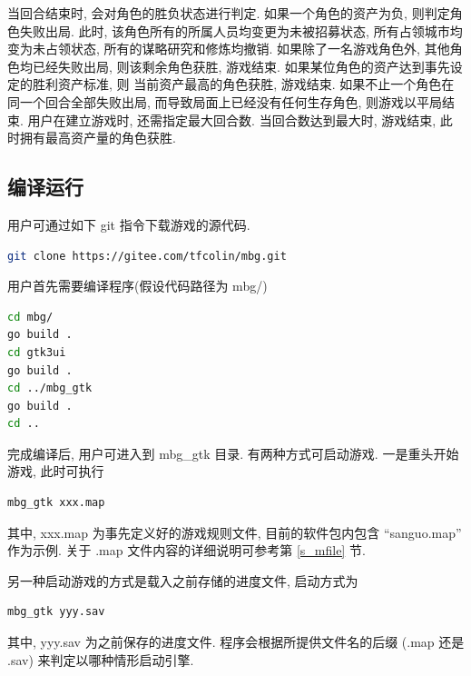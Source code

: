 \documentclass[UTF8, zihao=-4]{ctexart} %
\begin{document}
当回合结束时, 会对角色的胜负状态进行判定. 如果一个角色的资产为负, 则判定角色失败出局. 
此时, 该角色所有的所属人员均变更为未被招募状态, 所有占领城市均变为未占领状态,
所有的谋略研究和修炼均撤销. 如果除了一名游戏角色外, 其他角色均已经失败出局, 
则该剩余角色获胜, 游戏结束. 如果某位角色的资产达到事先设定的胜利资产标准, 则
当前资产最高的角色获胜, 游戏结束. 
如果不止一个角色在同一个回合全部失败出局, 而导致局面上已经没有任何生存角色, 则游戏以平局结束.
用户在建立游戏时, 还需指定最大回合数. 当回合数达到最大时, 游戏结束, 此时拥有最高资产量的角色获胜.

\subsection{编译运行}
\label{s_compile}
用户可通过如下 git 指令下载游戏的源代码.
\begin{lstlisting}[language=bash]
git clone https://gitee.com/tfcolin/mbg.git
\end{lstlisting}

用户首先需要编译程序(假设代码路径为 mbg/)
\begin{lstlisting}[language=bash]
cd mbg/
go build .
cd gtk3ui
go build .
cd ../mbg_gtk
go build .
cd ..
\end{lstlisting}

完成编译后, 用户可进入到 mbg\_gtk 目录.
有两种方式可启动游戏. 一是重头开始游戏, 此时可执行 
\begin{lstlisting}[language=bash]
mbg_gtk xxx.map
\end{lstlisting}
其中, xxx.map 为事先定义好的游戏规则文件, 目前的软件包内包含 ``sanguo.map'' 作为示例.
关于 .map 文件内容的详细说明可参考第 \ref{s_mfile} 节.

另一种启动游戏的方式是载入之前存储的进度文件, 启动方式为
\begin{lstlisting}[language=bash]
mbg_gtk yyy.sav
\end{lstlisting}
其中, yyy.sav 为之前保存的进度文件.
程序会根据所提供文件名的后缀 (.map 还是 .sav) 来判定以哪种情形启动引擎.
\end{document}
